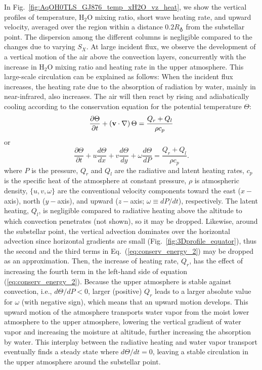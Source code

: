 \documentclass[11pt,numberedappendix,twocolappendix,]{emulateapj}
\def\water{H$_2$O }
\begin{document}
In Fig.~\ref{fig:AqOH0TLS_GJ876_temp_xH2O_vz_heat}, we show the vertical profiles of temperature, \water mixing ratio, short wave heating rate, and upward velocity, averaged over the region within a distance $0.2R_\earth$ from the substellar point. 
The dispersion among the different columns is negligible compared to the changes due to varying $S_X$. 
At large incident flux, we observe the development of a vertical motion of the air above the convection layers, concurrently with the increase in \water mixing ratio and heating rate in the upper atmosphere. 
This large-scale circulation can be explained as follows: When the incident flux increases, the heating rate due to the absorption of radiation by water, mainly in near-infrared, also increases. 
The air will then react by rising and adiabatically cooling according to the conservation equation for the potential temperature $\Theta $:
\begin{equation}
\frac{\partial \Theta }{\partial t} + ( {\bf v} \cdot \nabla ) \, \Theta = \frac{ Q_r + Q_l }{\rho c_p} \label{eq:conserv_energy}
\end{equation}
or
\begin{equation}
\frac{\partial \Theta }{\partial t} + u \frac{d\Theta }{dx} + v\frac{d\Theta }{dy} + \omega \frac{d\Theta }{dP} = \frac{ Q_r + Q_l }{\rho c_p}. \label{eq:conserv_energy_2}
\end{equation}
where $P$ is the pressure, $Q_r$ and $Q_l$ are the radiative and latent heating rates, $c_p$ is the specific heat of the atmosphere at constant pressure, $\rho $ is atmospheric density, $\{ u, v, \omega \}$ are the conventional velocity components toward the east ($x-$axis), north ($y-$axis), and upward ($z-$axis; $\omega \equiv dP/dt$), respectively. 
The latent heating, $Q_l$, is negligible compared to radiative heating above the altitude to which convection penetrates (not shown), so it may be dropped. 
Likewise, around the substellar point, the vertical advection dominates over the horizontal advection since horizontal gradients are small (Fig.~\ref{fig:3Dprofile_equator}), thus the second and the third terms in Eq.~(\ref{eq:conserv_energy_2}) may be dropped as an approximation. 
Then, the increase of heating rate, $Q_r$, has the effect of increasing the fourth term in the left-hand side of equation (\ref{eq:conserv_energy_2}). 
Because the upper atmosphere is stable against convection, i.e., $d \Theta / d P < 0 $, larger (positive) $Q_r$ leads to a larger absolute value for $\omega $ (with negative sign), which means that an upward motion develops. 
This upward motion of the atmosphere transports water vapor from the moist lower atmosphere to the upper atmosphere, lowering the vertical gradient of water vapor and increasing the moisture at altitude, further increasing the absorption by water. 
This interplay between the radiative heating and water vapor transport eventually finds a steady state where $d\Theta/dt = 0$, leaving a stable circulation in the upper atmosphere around the substellar point. 
\end{document}
